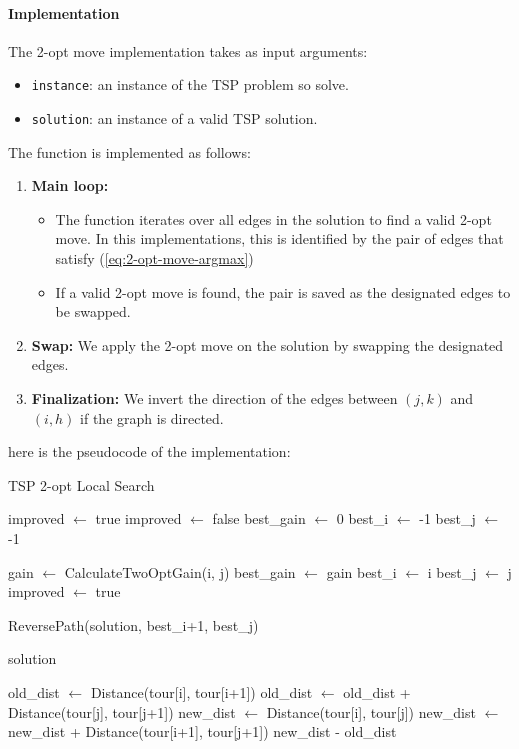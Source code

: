 \documentclass{article}
\begin{document}
\paragraph{Implementation}
The 2-opt move implementation takes as input arguments:
\begin{itemize}
	\item \texttt{instance}: an instance of the TSP problem so solve.
	\item \texttt{solution}: an instance of a valid TSP solution.
\end{itemize}
The function is implemented as follows:
\begin{enumerate}
	\item \textbf{Main loop:} 
	\begin{itemize}
	\item The function iterates over all edges in the solution to find a valid 2-opt move. In this implementations, this is identified by the pair of edges that satisfy (\ref{eq:2-opt-move-argmax})
	\item If a valid 2-opt move is found, the pair is saved as the designated edges to be swapped.
	\end{itemize}
	\item \textbf{Swap:} We apply the 2-opt move on the solution by swapping the designated edges.
	\item \textbf{Finalization:} We invert the direction of the edges between $(j, k)$ and $(i, h)$ if the graph is directed.
\end{enumerate}
here is the pseudocode of the implementation:
\begin{algorithm}[!ht]
\caption{TSP 2-opt Local Search}
\begin{algorithmic}[1]
\State improved $\gets$ true
    \State improved $\gets$ false
    \State best\_gain $\gets$ 0
    \State best\_i $\gets$ -1
    \State best\_j $\gets$ -1

            \State gain $\gets$ CalculateTwoOptGain(i, j)
                \State best\_gain $\gets$ gain
                \State best\_i $\gets$ i
                \State best\_j $\gets$ j
                \State improved $\gets$ true
            \EndIf
        \EndFor
    \EndFor

        \State ReversePath(solution, best\_i+1, best\_j)
    \EndIf
\EndWhile

\State \Return solution
\EndProcedure

    \State old\_dist $\gets$ Distance(tour[i], tour[i+1])
    \State old\_dist $\gets$ old\_dist + Distance(tour[j], tour[j+1])
    \State new\_dist $\gets$ Distance(tour[i], tour[j])
    \State new\_dist $\gets$ new\_dist + Distance(tour[i+1], tour[j+1])
    \State \Return new\_dist - old\_dist
\EndFunction
\end{algorithmic}
\end{algorithm}
\end{document}
